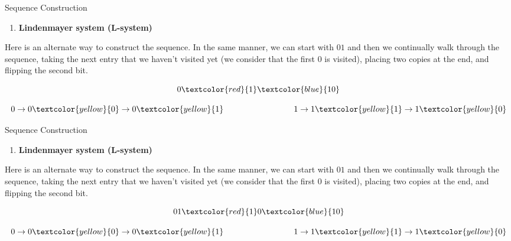 \documentclass{beamer}
\begin{document}
\begin{frame}{Sequence Construction}
    \begin{enumerate}[2]
    \item \textbf{\large Lindenmayer system (L-system)}
    \end{enumerate}
    \vspace{0.5cm}
    Here is an alternate way to construct the sequence. In the same manner, we can start with $01$ and then we continually walk through the sequence, taking the next entry that we haven't visited yet (we consider that the first $0$ is visited), placing two copies at the end, and flipping the second bit. 

    \[
    0\textcolor{red}{1}\textcolor{blue}{10}
    \]

    \[
        0 \rightarrow 0\textcolor{yellow}{0} \rightarrow 0\textcolor{yellow}{1} \hspace{3cm} 1 \rightarrow 1\textcolor{yellow}{1} \rightarrow 1\textcolor{yellow}{0}
    \]

\end{frame}

\begin{frame}{Sequence Construction}
    \begin{enumerate}[2]
    \item \textbf{\large Lindenmayer system (L-system)}
    \end{enumerate}
    \vspace{0.5cm}
    Here is an alternate way to construct the sequence. In the same manner, we can start with $01$ and then we continually walk through the sequence, taking the next entry that we haven't visited yet (we consider that the first $0$ is visited), placing two copies at the end, and flipping the second bit. 

    \[
    01\textcolor{red}{1}0\textcolor{blue}{10}
    \]

    \[
        0 \rightarrow 0\textcolor{yellow}{0} \rightarrow 0\textcolor{yellow}{1} \hspace{3cm} 1 \rightarrow 1\textcolor{yellow}{1} \rightarrow 1\textcolor{yellow}{0}
    \]

\end{frame}
\end{document}
